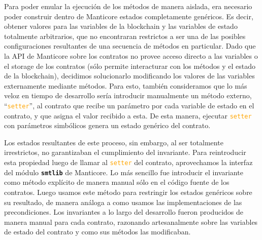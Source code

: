 Para poder emular la ejecución de los métodos de manera aislada, era necesario poder construir dentro de Manticore estados completamente genéricos.
Es decir, obtener valores para las variables de la blockchain y las variables de estado totalmente arbitrarios, que no encontraran restrictos a ser una de las posibles configuraciones resultantes de una secuencia de métodos en particular.
Dado que la API de Manticore sobre los contratos no provee acceso directo a las variables o el storage de los contratos (sólo permite interacturar con los métodos y el estado de la blockchain), decidimos solucionarlo modificando los valores de las variables externamente mediante métodos.
Para esto, también consideramos que lo más veloz en tiempo de desarrollo sería introducir manualmente un método externo, ``\textcolor{orange}{\texttt{setter}}'', al contrato que recibe un parámetro por cada variable de estado en el contrato, y que asigna el valor recibido a esta.
De esta manera, ejecutar \textcolor{orange}{\texttt{setter}} con parámetros simbólicos genera un estado genérico del contrato.

Los estados resultantes de este proceso, sin embargo, al ser totalmente irrestrictos, no garantizaban el cumplimiento del invariante.
Para reintroducir esta propiedad luego de llamar al \textcolor{orange}{\texttt{setter}} del contrato, aprovechamos la interfaz del módulo \texttt{\textbf{smtlib}} de Manticore.
Lo más sencillo fue introducir el invariante como método explícito de manera manual sólo en el código fuente de los contratos.
Luego usamos este método para restringir los estados genéricos sobre su resultado, de manera análoga a como usamos las implementaciones de las precondiciones.
Los invariantes a lo largo del desarrollo fueron producidos de manera manual para cada contrato, razonando artesanalmente sobre las variables de estado del contrato y como sus métodos las modificaban.

